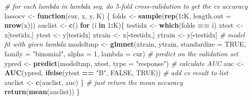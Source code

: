 \documentclass[
]{article}
\newenvironment{Shaded}{\begin{snugshade}}{\end{snugshade}}
\newcommand{\AttributeTok}[1]{\textcolor[rgb]{0.13,0.29,0.53}{#1}}
\newcommand{\CommentTok}[1]{\textcolor[rgb]{0.56,0.35,0.01}{\textit{#1}}}
\newcommand{\ConstantTok}[1]{\textcolor[rgb]{0.56,0.35,0.01}{#1}}
\newcommand{\ControlFlowTok}[1]{\textcolor[rgb]{0.13,0.29,0.53}{\textbf{#1}}}
\newcommand{\DecValTok}[1]{\textcolor[rgb]{0.00,0.00,0.81}{#1}}
\newcommand{\FunctionTok}[1]{\textcolor[rgb]{0.13,0.29,0.53}{\textbf{#1}}}
\newcommand{\NormalTok}[1]{#1}
\newcommand{\OtherTok}[1]{\textcolor[rgb]{0.56,0.35,0.01}{#1}}
\newcommand{\SpecialCharTok}[1]{\textcolor[rgb]{0.81,0.36,0.00}{\textbf{#1}}}
\newcommand{\StringTok}[1]{\textcolor[rgb]{0.31,0.60,0.02}{#1}}
\begin{document}
\begin{Shaded}
\begin{Highlighting}[]
    \CommentTok{\# for each lambda in lambda seq, do 5{-}fold cross{-}validation to get the cv accuracy}
\NormalTok{    lassocv }\OtherTok{\textless{}{-}} \ControlFlowTok{function}\NormalTok{(cur, x, y, K) \{}
\NormalTok{        folds }\OtherTok{\textless{}{-}} \FunctionTok{sample}\NormalTok{(}\FunctionTok{rep}\NormalTok{(}\DecValTok{1}\SpecialCharTok{:}\NormalTok{K, }\AttributeTok{length.out =} \FunctionTok{nrow}\NormalTok{(x)))}
\NormalTok{            auclist }\OtherTok{\textless{}{-}} \FunctionTok{c}\NormalTok{()}
            \ControlFlowTok{for}\NormalTok{ (i }\ControlFlowTok{in} \DecValTok{1}\SpecialCharTok{:}\NormalTok{K)\{}
\NormalTok{            testidx }\OtherTok{\textless{}{-}} \FunctionTok{which}\NormalTok{(folds }\SpecialCharTok{==}\NormalTok{ i)}
\NormalTok{            xtest }\OtherTok{\textless{}{-}}\NormalTok{ x[testidx,]}
\NormalTok{            ytest }\OtherTok{\textless{}{-}}\NormalTok{ y[testidx]}
\NormalTok{            xtrain }\OtherTok{\textless{}{-}}\NormalTok{ x[}\SpecialCharTok{{-}}\NormalTok{testidx,]}
\NormalTok{            ytrain }\OtherTok{\textless{}{-}}\NormalTok{ y[}\SpecialCharTok{{-}}\NormalTok{testidx]}
            \CommentTok{\# model fit with given lambda}
\NormalTok{            modeltmp }\OtherTok{\textless{}{-}} \FunctionTok{glmnet}\NormalTok{(xtrain, ytrain, }\AttributeTok{standardize =} \ConstantTok{TRUE}\NormalTok{, }\AttributeTok{family =} \StringTok{"binomial"}\NormalTok{, }\AttributeTok{alpha =} \DecValTok{1}\NormalTok{, }\AttributeTok{lambda =}\NormalTok{ cur)}
            \CommentTok{\# predict on the validation set}
\NormalTok{            ypred }\OtherTok{\textless{}{-}} \FunctionTok{predict}\NormalTok{(modeltmp, xtest, }\AttributeTok{type =} \StringTok{"response"}\NormalTok{)}
            \CommentTok{\# calculate AUC}
\NormalTok{            auc }\OtherTok{\textless{}{-}} \FunctionTok{AUC}\NormalTok{(ypred, }\FunctionTok{ifelse}\NormalTok{(ytest }\SpecialCharTok{==} \StringTok{"B"}\NormalTok{, }\ConstantTok{FALSE}\NormalTok{, }\ConstantTok{TRUE}\NormalTok{))}
            \CommentTok{\# add cv result to list}
\NormalTok{            auclist }\OtherTok{\textless{}{-}} \FunctionTok{c}\NormalTok{(auclist, auc)}
\NormalTok{        \}}
        \CommentTok{\# just return the mean accuracy}
        \FunctionTok{return}\NormalTok{(}\FunctionTok{mean}\NormalTok{(auclist))}
\NormalTok{    \}}
    

\end{Highlighting}
\end{Shaded}
\end{document}
